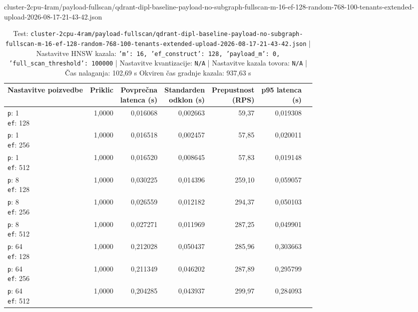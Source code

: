 \begin{table}[htbp]
  \centering
\small
  \caption{cluster-2cpu-4ram/payload-fullscan/qdrant-dipl-baseline-payload-no-subgraph-fullscan-m-16-ef-128-random-768-100-tenants-extended-upload-2026-08-17-21-43-42.json}
  \label{tab:cluster-2cpu-4ram:payload-fullscan:qdrant-dipl-baseline-payload-no-subgraph-fullscan-m-16-ef-128-random-768-100-tenants-extended-upload-2026-08-17-21-43-42.json}
  \begin{tabularx}{\textwidth}{Xrrrrrr}
    \toprule
    Nastavitve poizvedbe & Priklic & \makecell{Povprečna\\latenca (s)} & \makecell{Standarden\\odklon (s)} & \makecell{Prepustnost\\(RPS)} & \makecell{p95 latenca\\(s)}  \\
    \midrule
    \makecell{\texttt{p}: 1\\\texttt{ef}: 128} & 1,0000 & 0,016068 & 0,002663 & 59,37 & 0,019308 \\
    \makecell{\texttt{p}: 1\\\texttt{ef}: 256} & 1,0000 & 0,016518 & 0,002457 & 57,85 & 0,020011 \\
    \makecell{\texttt{p}: 1\\\texttt{ef}: 512} & 1,0000 & 0,016520 & 0,008645 & 57,83 & 0,019148 \\
    \makecell{\texttt{p}: 8\\\texttt{ef}: 128} & 1,0000 & 0,030225 & 0,014396 & 259,10 & 0,059057 \\
    \makecell{\texttt{p}: 8\\\texttt{ef}: 256} & 1,0000 & 0,026559 & 0,012182 & 294,37 & 0,050103 \\
    \makecell{\texttt{p}: 8\\\texttt{ef}: 512} & 1,0000 & 0,027271 & 0,011969 & 287,25 & 0,049901 \\
    \makecell{\texttt{p}: 64\\\texttt{ef}: 128} & 1,0000 & 0,212028 & 0,050437 & 285,96 & 0,303663 \\
    \makecell{\texttt{p}: 64\\\texttt{ef}: 256} & 1,0000 & 0,211349 & 0,046202 & 287,89 & 0,295799 \\
    \makecell{\texttt{p}: 64\\\texttt{ef}: 512} & 1,0000 & 0,204285 & 0,043937 & 299,97 & 0,284093 \\
    \bottomrule
  \end{tabularx}
\caption* {Test: \texttt{cluster-2cpu-4ram/payload-fullscan/qdrant-dipl-baseline-payload-no-subgraph-fullscan-m-16-ef-128-random-768-100-tenants-extended-upload-2026-08-17-21-43-42.json} | Nastavitve HNSW kazala: \texttt{{'m': 16, 'ef\_construct': 128, 'payload\_m': 0, 'full\_scan\_threshold': 100000}} | Nastavitve kvantizacije: \texttt{N/A} | Nastavitve kazala tovora: \texttt{N/A} | Čas nalaganja: 102,69 s Okviren čas gradnje kazala: 937,63 s}\end{table}


